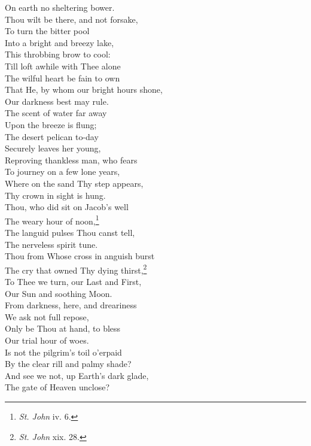  On earth no sheltering bower. \\
  Thou wilt be there, and not forsake, \\
 To turn the bitter pool \\
 Into a bright and breezy lake, \\
 This throbbing brow to cool: \\
 Till loft awhile with Thee alone \\
 The wilful heart be fain to own \\
 That He, by whom our bright hours shone, \\
 Our darkness best may rule. \\
  The scent of water far away \\
 Upon the breeze is flung; \\
 The desert pelican to-day \\
 Securely leaves her young, \\
 Reproving thankless man, who fears \\
 To journey on a few lone years, \\
 Where on the sand Thy step appears, \\
 Thy crown in sight is hung. \\
  Thou, who did sit on Jacob’s well \\
 The weary hour of noon,\footnote{\emph{St. John} iv. 6.} \\
 The languid pulses Thou canst tell, \\
 The nerveless spirit tune. \\
 Thou from Whose cross in anguish burst \\
 The cry that owned Thy dying thirst,\footnote{\emph{St. John} xix. 28.} \\
 To Thee we turn, our Last and First, \\
 Our Sun and soothing Moon. \\
  From darkness, here, and dreariness \\
 We ask not full repose, \\
 Only be Thou at hand, to bless \\
 Our trial hour of woes. \\
 Is not the pilgrim’s toil o’erpaid \\
 By the clear rill and palmy shade? \\
 And see we not, up Earth’s dark glade, \\
 The gate of Heaven unclose?\\

